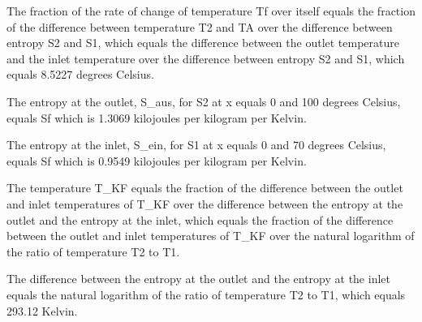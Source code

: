 The fraction of the rate of change of temperature Tf over itself equals the fraction of the difference between temperature T2 and TA over the difference between entropy S2 and S1, which equals the difference between the outlet temperature and the inlet temperature over the difference between entropy S2 and S1, which equals 8.5227 degrees Celsius.

The entropy at the outlet, S_aus, for S2 at x equals 0 and 100 degrees Celsius, equals Sf which is 1.3069 kilojoules per kilogram per Kelvin.

The entropy at the inlet, S_ein, for S1 at x equals 0 and 70 degrees Celsius, equals Sf which is 0.9549 kilojoules per kilogram per Kelvin.

The temperature T_KF equals the fraction of the difference between the outlet and inlet temperatures of T_KF over the difference between the entropy at the outlet and the entropy at the inlet, which equals the fraction of the difference between the outlet and inlet temperatures of T_KF over the natural logarithm of the ratio of temperature T2 to T1.

The difference between the entropy at the outlet and the entropy at the inlet equals the natural logarithm of the ratio of temperature T2 to T1, which equals 293.12 Kelvin.